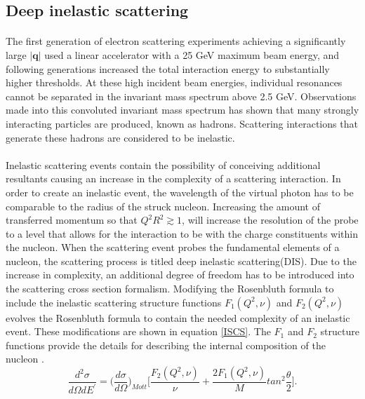 \subsection{Deep inelastic scattering}\label{sec:DIS}
\paragraph{}The first generation of electron scattering experiments achieving a significantly large  $|\boldsymbol{q}|$ used a linear accelerator with a 25 GeV maximum beam energy, and following generations increased the total interaction energy to substantially higher thresholds. At these high incident beam energies, individual resonances cannot be separated in the invariant mass spectrum above 2.5 GeV. Observations made into this convoluted invariant mass spectrum has shown that many strongly interacting particles are produced, known as hadrons. Scattering interactions that generate these hadrons are considered to be inelastic. 
\paragraph{}Inelastic scattering events contain the possibility of conceiving additional resultants causing an increase in the complexity of a scattering interaction. In order to create an inelastic event, the wavelength of the virtual photon has to be comparable to the radius of the struck nucleon. Increasing the amount of transferred momentum so that $Q^2R^2 \gtrsim 1$, will increase the resolution of the probe to a level that allows for the interaction to be with the charge constituents within the nucleon. When the scattering event probes the fundamental elements of a nucleon, the scattering process is titled deep inelastic scattering(DIS). Due to the increase in complexity, an additional degree of freedom has to be introduced into the scattering cross section formalism. Modifying the Rosenbluth formula to include the inelastic scattering structure functions $F_1(Q^2,\nu)$ and $F_2(Q^2,\nu)$ evolves the Rosenbluth formula to contain the needed complexity of an inelastic event. These modifications are shown in equation \ref{ISCS}. The $F_1$ and $F_2$ structure functions provide the details for describing the internal composition of the nucleon \cite{PnN}. 
\begin{equation}
\label{ISCS}
\frac{d^2\sigma}{d\Omega dE^\prime}=\bigg(\frac{d\sigma}{d\Omega}\bigg)_{Mott} \bigg\lbrack \frac{F_2(Q^2,\nu)}{\nu} + \frac{2F_1(Q^2,\nu)}{M}tan^2\frac{\theta}{2} \bigg \rbrack.
\end{equation}  

